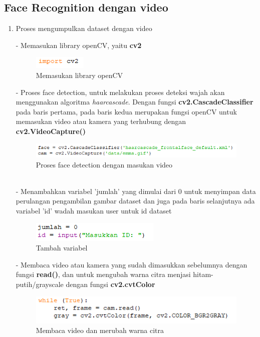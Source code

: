 
\subsection{Face Recognition dengan video}
\begin{enumerate}[1.]
\item Proses mengumpulkan dataset dengan video

- Memasukan library openCV, yaitu \textbf{cv2}
\begin{figure}[h!]
    \centering
    \includegraphics[width=0.3\linewidth]{images/fr_1.PNG}
    \caption{Memasukan library openCV}
\end{figure}

-  Proses face detection, untuk melakukan proses deteksi wajah akan menggunakan algoritma \emph{haarcascade}. Dengan fungsi \textbf{cv2.CascadeClassifier} pada baris pertama, 
pada baris kedua merupakan fungsi openCV untuk memasukan video atau kamera yang terhubung dengan \textbf{cv2.VideoCapture()}
\begin{figure}[h!]
    \centering
    \includegraphics[width=0.85\linewidth]{images/fr_2.PNG}
    \caption{Proses face detection dengan masukan video}
\end{figure}\\

- Menambahkan variabel 'jumlah' yang dimulai dari 0 untuk menyimpan data perulangan pengambilan gambar dataset
dan juga pada baris selanjutnya ada variabel 'id' wadah masukan user untuk id dataset
\begin{figure}[h!]
    \centering
    \includegraphics[width=0.45\linewidth]{images/fr_3.PNG}
    \caption{Tambah variabel}
\end{figure}
\newpage
- Membaca video atau kamera yang sudah dimasukkan sebelumnya dengan fungsi \textbf{read()}, dan untuk mengubah warna citra menjasi hitam-putih/grayscale
dengan fungsi \textbf{cv2.cvtColor}
\begin{figure}[h!]
    \centering
    \includegraphics[width=0.85\linewidth]{images/fr_4.PNG}
    \caption{Membaca video dan merubah warna citra}
\end{figure}


\end{enumerate}
